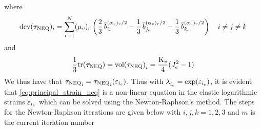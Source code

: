 where
\begin{equation}
    \text{dev}(\bm{\tau}_{\text{NEQ}})_{i} 
    = \sum_{r=1}^{N} (\mu_{v})_{r} \left( \frac{2}{3} \,\overline{b}_{{i}_e}^{(\alpha_{v})_{r}/2} - \frac{1}{3} \,\overline{b}_{{j}_e}^{(\alpha_{v})_{r}/2} - \frac{1}{3} \,\overline{b}_{{k}_e}^{(\alpha_{v})_{r}/2} \right) \quad i \neq j \neq k 
    \label{eq:principal_kirchoff_stress_dev}
\end{equation}
and
\begin{equation}
    \frac{1}{3} \text{tr}(\bm{\tau}_{\text{NEQ}}) = {\text{vol}({\tau}_{\text{NEQ}})}_{i}
    = \frac{\mathrm{K}_{v}}{4}(J_{e}^2-1)
    \label{eq:principal_kirchoff_stress_vol}
\end{equation}
We thus have that \({\bm{\tau}_{\text{NEQ}}}_{i} = {\bm{\tau}_{\text{NEQ}}}_{i}(\varepsilon_{{i}_e})\). Thus  with \(\lambda^{}_{{i}_e} = \exp(\varepsilon_{{i}_e})\), it is evident that \cref{eq:principal_strain_neq} is a non-linear equation in the elastic logarithmic strains \(\varepsilon_{{i}_e}\) which can be solved using the Newton-Raphson's method. 
The steps for the Newton-Raphson iterations are given below with \(i, j, k = 1,2,3\) and \(m\) is the current iteration number

